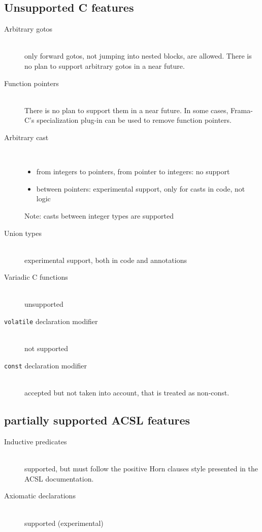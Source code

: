 \documentclass[a4paper,11pt,twoside,openright]{report}
\begin{document}
\subsection{Unsupported C features}

\begin{description}
\item[Arbitrary gotos] ~\\
  only forward gotos, not jumping into nested
  blocks, are allowed. There is no plan to support arbitrary gotos in
  a near future.
\item[Function pointers] ~\\
  There is no plan to support them in a near
  future. In some cases, Frama-C's specialization plug-in can be used to
  remove function pointers.
\item[Arbitrary cast] ~\\
  \begin{itemize}
  \item from integers to pointers, from pointer to integers: no support
  \item between pointers: experimental support, only for casts in code, not logic
  \end{itemize}
  Note: casts between integer types are supported
\item[Union types] ~\\
  experimental support, both in code and annotations
\item[Variadic C functions] ~\\
  unsupported

\item[\texttt{volatile} declaration modifier]~\\
  not supported
\item[\texttt{const} declaration modifier]~\\
  accepted but not taken into account, that is treated as non-const.

\end{description}


\subsection{partially supported ACSL features}

\begin{description}
\item[Inductive predicates] ~\\
  supported, but must follow the positive
  Horn clauses style presented in the ACSL documentation.
\item[Axiomatic declarations] ~\\
  supported (experimental)
\end{description}
\end{document}
